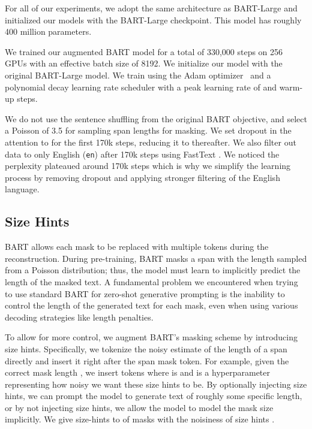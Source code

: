\documentclass[11pt,a4paper]{article}
\begin{document}
For all of our experiments, we adopt the same architecture as BART-Large and initialized our models with the BART-Large checkpoint. This model has roughly 400 million parameters.

We trained our augmented BART model for a total of 330,000 steps on 256 GPUs with an effective batch size of 8192. We initialize our model with the original BART-Large model. We train using the Adam optimizer~\citep{ADAM} and a polynomial decay learning rate scheduler with a peak learning rate of  and  warm-up steps.

We do not use the sentence shuffling from the original BART objective, and select a Poisson  of 3.5 for sampling span lengths for masking. We set dropout in the attention to  for the first 170k steps, reducing it to  thereafter. We also filter out data to only English (\verb+en+) after 170k steps using FastText \cite{fasttext}. We noticed the perplexity plateaued around 170k steps which is why we simplify the learning process by removing dropout and applying stronger filtering of the English language. 

\subsection{Size Hints}
\label{sec:model:size-hints}

BART allows each mask to be replaced with multiple tokens during the reconstruction. During pre-training, BART masks a span with the length sampled from a Poisson distribution; thus, the model must learn to implicitly predict the length of the masked text. A fundamental problem we encountered when trying to use standard BART for zero-shot generative prompting is the inability to control the length of the generated text for each mask, even when using various decoding strategies like length penalties. 

To allow for more control, we augment BART's masking scheme by introducing size hints. Specifically, we tokenize the noisy estimate of the length of a span directly and insert it right after the span mask token. For example, given the correct mask length , we insert  \textit{} tokens where  is  and  is a hyperparameter representing how noisy we want these size hints to be. By optionally injecting size hints, we can prompt the model to generate text of roughly some specific length, or by not injecting size hints, we allow the model to model the mask size implicitly. We give size-hints to  of masks with the noisiness of size hints . 
\end{document}
